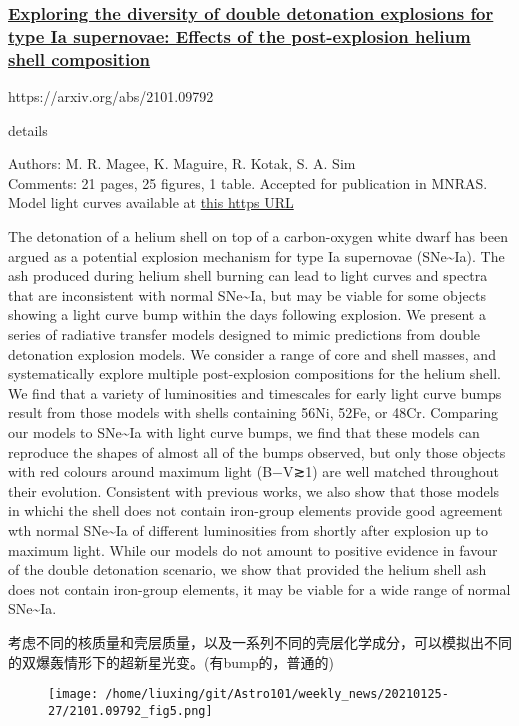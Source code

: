 \documentclass[
]{article}
\begin{document}
\hypertarget{header-n207}{%
\subsubsection{\texorpdfstring{\href{./2101.09792.pdf}{Exploring the
diversity of double detonation explosions for type Ia supernovae:
Effects of the post-explosion helium shell
composition}}{Exploring the diversity of double detonation explosions for type Ia supernovae: Effects of the post-explosion helium shell composition}}\label{header-n207}}

https://arxiv.org/abs/2101.09792

details

Authors: M. R. Magee, K. Maguire, R. Kotak, S. A. Sim\\
Comments: 21 pages, 25 figures, 1 table. Accepted for publication in
MNRAS. Model light curves available at
\href{https://github.com/MarkMageeAstro/TURTLS-Light-curves}{this https
URL}

The detonation of a helium shell on top of a carbon-oxygen white dwarf
has been argued as a potential explosion mechanism for type Ia
supernovae (SNe\textasciitilde Ia). The ash produced during helium shell
burning can lead to light curves and spectra that are inconsistent with
normal SNe\textasciitilde Ia, but may be viable for some objects showing
a light curve bump within the days following explosion. We present a
series of radiative transfer models designed to mimic predictions from
double detonation explosion models. We consider a range of core and
shell masses, and systematically explore multiple post-explosion
compositions for the helium shell. We find that a variety of
luminosities and timescales for early light curve bumps result from
those models with shells containing 56Ni, 52Fe, or 48Cr. Comparing our
models to SNe\textasciitilde Ia with light curve bumps, we find that
these models can reproduce the shapes of almost all of the bumps
observed, but only those objects with red colours around maximum light
(B−V≳1) are well matched throughout their evolution. Consistent with
previous works, we also show that those models in whichi the shell does
not contain iron-group elements provide good agreement wth normal
SNe\textasciitilde Ia of different luminosities from shortly after
explosion up to maximum light. While our models do not amount to
positive evidence in favour of the double detonation scenario, we show
that provided the helium shell ash does not contain iron-group elements,
it may be viable for a wide range of normal SNe\textasciitilde Ia.

考虑不同的核质量和壳层质量，以及一系列不同的壳层化学成分，可以模拟出不同的双爆轰情形下的超新星光变。(有bump的，普通的)

\begin{figure}
\centering
\texttt{[image: /home/liuxing/git/Astro101/weekly\_news/20210125-27/2101.09792\_fig5.png]}
\caption{}
\end{figure}
\end{document}
